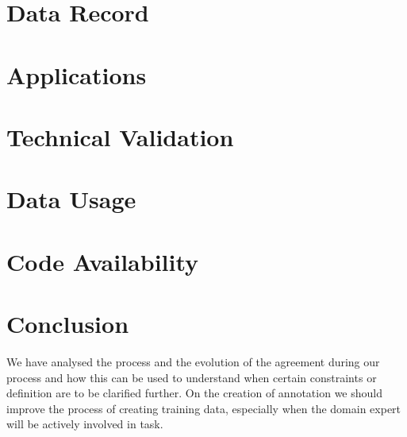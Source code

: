 \documentclass[a4paper,10pt]{article}
\begin{document}
\section{Data Record}

\section{Applications}

\section{Technical Validation} 

\section{Data Usage} 

\section{Code Availability}

\section{Conclusion}

We have analysed the process and the evolution of the agreement during our process and how this can be used to understand when certain constraints or definition are to be clarified further. 
On the creation of annotation we should improve the process of creating training data, especially when the domain expert will be actively involved in task. 


  
\end{document}
